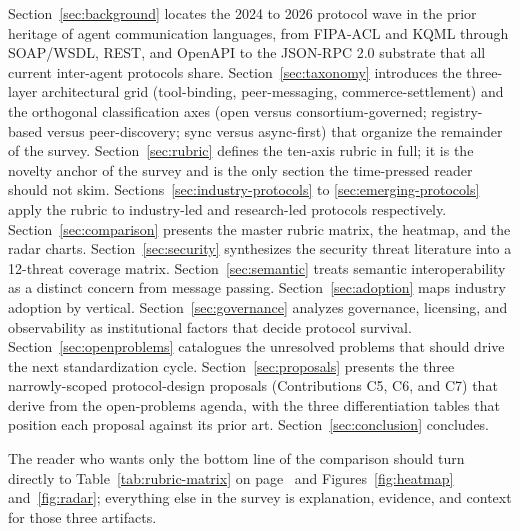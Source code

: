 Section~\ref{sec:background} locates the 2024 to 2026 protocol wave
in the prior heritage of agent communication languages, from
FIPA-ACL and KQML through SOAP/WSDL, REST, and OpenAPI to the
JSON-RPC 2.0 substrate that all current inter-agent protocols
share. Section~\ref{sec:taxonomy} introduces the three-layer
architectural grid (tool-binding, peer-messaging,
commerce-settlement) and the orthogonal classification axes
(open versus consortium-governed; registry-based versus
peer-discovery; sync versus async-first) that organize the
remainder of the survey. Section~\ref{sec:rubric} defines the
ten-axis rubric in full; it is the novelty anchor of the survey
and is the only section the time-pressed reader should not skim.
Sections~\ref{sec:industry-protocols} to \ref{sec:emerging-protocols}
apply the rubric to industry-led and research-led protocols
respectively. Section~\ref{sec:comparison} presents the master
rubric matrix, the heatmap, and the radar charts.
Section~\ref{sec:security} synthesizes the security threat
literature into a 12-threat coverage matrix.
Section~\ref{sec:semantic} treats semantic interoperability as
a distinct concern from message passing.
Section~\ref{sec:adoption} maps industry adoption by vertical.
Section~\ref{sec:governance} analyzes governance, licensing, and
observability as institutional factors that decide protocol
survival. Section~\ref{sec:openproblems} catalogues the
unresolved problems that should drive the next standardization
cycle. Section~\ref{sec:proposals} presents the three
narrowly-scoped protocol-design proposals (Contributions
C5, C6, and C7) that derive from the open-problems
agenda, with the three differentiation tables that
position each proposal against its prior art.
Section~\ref{sec:conclusion} concludes.

The reader who wants only the bottom line of the comparison
should turn directly to Table~\ref{tab:rubric-matrix} on
page~\pageref{tab:rubric-matrix} and Figures~\ref{fig:heatmap}
and~\ref{fig:radar}; everything else in the survey is
explanation, evidence, and context for those three artifacts.

